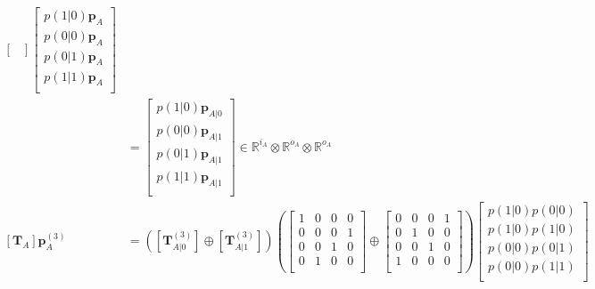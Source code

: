 \documentclass[10pt, a4paper]{article}
\numberwithin{equation}{section} %
\theoremstyle{definition}
\theoremstyle{plain}
\newcommand{\?}{\mathrel{?}} %
\newcommand{\R}{\mathbb{R}} %
\newcommand{\cvec}[1]{\boldsymbol{\mathbf{#1}}}    %
\newcommand{\matr}[2][]{\left[\mathbf{#2}#1\right]} %
\begin{document}
\begin{align}
\begin{bmatrix}
                                      \end{bmatrix}
                                      \begin{bmatrix} 
                                        p(1|0) \cvec{p}_A \\ p(0|0) \cvec{p}_A \\
                                        p(0|1) \cvec{p}_A \\ p(1|1) \cvec{p}_A \\ 
                                      \end{bmatrix} \\
                                      &=
                                      \begin{bmatrix} 
                                        p(1|0) \cvec{p}_{A|0} \\ p(0|0) \cvec{p}_{A|1} \\
                                        p(0|1) \cvec{p}_{A|1} \\ p(1|1) \cvec{p}_{A|1} \\ 
                                      \end{bmatrix} \in \R^{i_A} \otimes \R^{o_A} \otimes \R^{o_A} \\
                    \matr[_A]{T} \cvec{p}_A^{(3)} &= \left( \matr[_{A|0}^{(3)}]{T} \oplus \matr[_{A|1}^{(3)}]{T} \right)
                    \left(\begin{bmatrix}
                        1 & 0 & 0 & 0 \\
                        0 & 0 & 0 & 1 \\
                        0 & 0 & 1 & 0 \\
                        0 & 1 & 0 & 0 \\
                        \end{bmatrix} \oplus \begin{bmatrix}
                        0 & 0 & 0 & 1 \\
                        0 & 1 & 0 & 0 \\
                        0 & 0 & 1 & 0 \\
                        1 & 0 & 0 & 0 \\
                    \end{bmatrix}\right)
                    \begin{bmatrix} 
                      p(1|0) p(0|0) \\ p(1|0) p(1|0) \\ p(0|0) p(0|1) \\ p(0|0) p(1|1) \\

\end{bmatrix}
\end{align}
\end{document}
